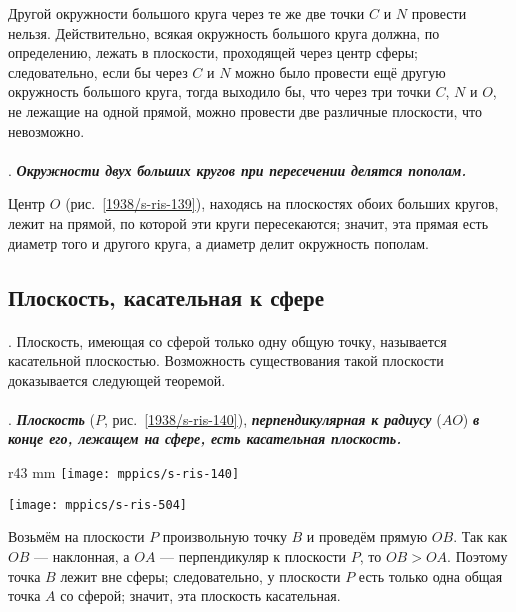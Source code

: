 Другой окружности большого круга через те же две точки $C$ и $N$ провести нельзя.
Действительно, всякая окружность большого круга должна, по определению, лежать в плоскости, проходящей через центр сферы;
следовательно, если бы через $C$ и $N$ можно было провести ещё другую окружность большого круга, тогда выходило бы, что через три точки $C$, $N$ и $O$, не лежащие на одной прямой, можно провести две различные плоскости, что невозможно.

\paragraph{}\label{1938/s130}
.
\textbf{\emph{Окружности двух больших кругов при пересечении делятся пополам.}}

Центр $O$ (рис.~\ref{1938/s-ris-139}), находясь на плоскостях обоих больших кругов, лежит на прямой, по которой эти круги пересекаются;
значит, эта прямая есть диаметр того и другого круга, а диаметр делит окружность пополам.

\subsection*{Плоскость, касательная к сфере}

\paragraph{}\label{1938/s131}
.
Плоскость, имеющая со сферой только одну общую точку, называется касательной плоскостью.
Возможность существования такой плоскости доказывается следующей теоремой.

\paragraph{}\label{1938/s132}
.
\textbf{\emph{Плоскость}} ($P$, рис.~\ref{1938/s-ris-140}), \textbf{\emph{перпендикулярная к радиусу}} ($AO$) \textbf{\emph{в конце его, лежащем на сфере, есть касательная плоскость.}}

\begin{wrapfigure}{r}{43 mm}
\vskip-2mm
\centering
\texttt{[image: mppics/s-ris-140]}
\caption{}\label{1938/s-ris-140}
\bigskip
\texttt{[image: mppics/s-ris-504]}
\caption{}\label{1938/s-ris-504}
\end{wrapfigure}

Возьмём на плоскости $P$ произвольную точку $B$ и проведём прямую $OB$.
Так как $OB$ — наклонная, а $OA$ — перпендикуляр к плоскости $P$, то $OB>OA$.
Поэтому точка $B$ лежит вне сферы;
следовательно, у плоскости $P$ есть только одна общая точка $A$ со сферой;
значит, эта плоскость касательная.


